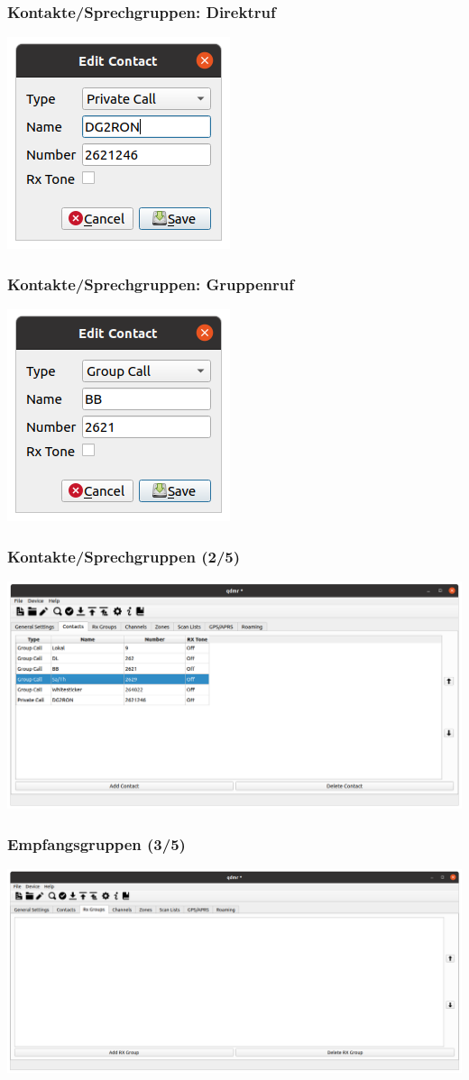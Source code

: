 \documentclass[aspectratio=169]{beamer}
\begin{document}
\begin{frame} \frametitle{Kontakte/Sprechgruppen: Direktruf}
\begin{center}
 \includegraphics[width=0.25\linewidth]{../fig/qdmr-edit-contact-private-call.png}
\end{center}
\end{frame}

\begin{frame} \frametitle{Kontakte/Sprechgruppen: Gruppenruf}
\begin{center}
 \includegraphics[width=0.25\linewidth]{../fig/qdmr-edit-contact-group-call.png}
\end{center}
\end{frame}

\begin{frame} \frametitle{Kontakte/Sprechgruppen (2/5)}
\begin{center}
 \includegraphics[width=0.75\linewidth]{../fig/qdmr-contacts-example.png}
\end{center}
\end{frame}

\begin{frame} \frametitle{Empfangsgruppen (3/5)}
\begin{center}
 \includegraphics[width=0.75\linewidth]{../fig/qdmr-rxgroup-empty.png}
\end{center}
\end{frame}
\end{document}
